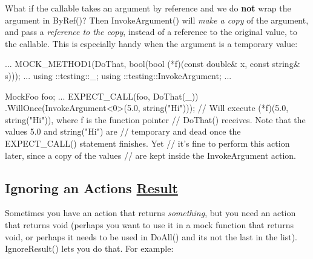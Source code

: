 What if the callable takes an argument by reference and we do {\bfseries not} wrap the argument in {\ttfamily By\+Ref()}? Then {\ttfamily Invoke\+Argument()} will {\itshape make a copy} of the argument, and pass a {\itshape reference to the copy}, instead of a reference to the original value, to the callable. This is especially handy when the argument is a temporary value\+:


\begin{DoxyCode}
...
  MOCK\_METHOD1(DoThat, \textcolor{keywordtype}{bool}(\textcolor{keywordtype}{bool} (*f)(\textcolor{keyword}{const} \textcolor{keywordtype}{double}& x, \textcolor{keyword}{const} \textcolor{keywordtype}{string}& s)));
...
using ::testing::\_;
using ::testing::InvokeArgument;
...

  MockFoo foo;
  ...
  EXPECT\_CALL(foo, DoThat(\_))
      .WillOnce(InvokeArgument<0>(5.0, \textcolor{keywordtype}{string}(\textcolor{stringliteral}{"Hi"})));
  \textcolor{comment}{// Will execute (*f)(5.0, string("Hi")), where f is the function pointer}
  \textcolor{comment}{// DoThat() receives.  Note that the values 5.0 and string("Hi") are}
  \textcolor{comment}{// temporary and dead once the EXPECT\_CALL() statement finishes.  Yet}
  \textcolor{comment}{// it's fine to perform this action later, since a copy of the values}
  \textcolor{comment}{// are kept inside the InvokeArgument action.}
\end{DoxyCode}


\subsection*{Ignoring an Action\textquotesingle{}s \hyperlink{classResult}{Result}}

Sometimes you have an action that returns {\itshape something}, but you need an action that returns {\ttfamily void} (perhaps you want to use it in a mock function that returns {\ttfamily void}, or perhaps it needs to be used in {\ttfamily Do\+All()} and it\textquotesingle{}s not the last in the list). {\ttfamily Ignore\+Result()} lets you do that. For example\+:


